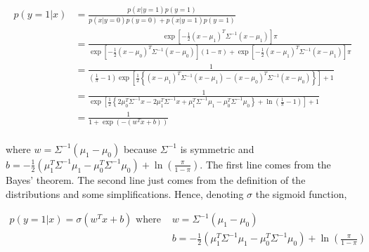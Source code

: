 \documentclass[a4paper, 11pt]{report}
\begin{document}
\begin{enumerate}[label=\alph*]
    \begin{equation*}
        \begin{aligned}
        p \left( y = 1 | x \right) &= \frac{p \left( x | y = 1 \right) p ( y = 1 )}{p(x | y = 0) p(y = 0) + p(x | y = 1) p(y = 1)} \\
        &= \frac{\exp \left[ - \frac{1}{2} \left( x - \mu_{1} \right)^{T} \Sigma^{-1} \left( x - \mu_{1} \right) \right] \pi}{\exp \left[ - \frac{1}{2} \left( x - \mu_{0} \right)^{T} \Sigma^{-1} \left( x - \mu_{0} \right) \right] \left( 1 - \pi \right) + \exp \left[ - \frac{1}{2} \left( x - \mu_{1} \right)^{T} \Sigma^{-1} \left( x - \mu_{1} \right) \right] \pi} \\
        &= \frac{1}{\left( \frac{1}{\pi} - 1 \right) \exp \left[ \frac{1}{2} \left\{ \left( x - \mu_{1} \right)^{T} \Sigma^{-1} \left( x - \mu_{1} \right) - \left( x - \mu_{0} \right)^{T} \Sigma^{-1} \left( x - \mu_{0} \right) \right\} \right] + 1} \\
        &= \frac{1}{\exp \left[ \frac{1}{2} \left\{ 2 \mu_{0}^{T} \Sigma^{-1} x - 2 \mu_{1}^{T} \Sigma^{-1} x + \mu_{1}^{T} \Sigma^{-1} \mu_{1} - \mu_{0}^{T} \Sigma^{-1} \mu_{0} \right\} + \ln \left( \frac{1}{\pi} - 1 \right) \right] + 1} \\
        &= \frac{1}{1 + \exp \left( -(w^{T}x + b) \right)} \\
        \end{aligned}
    \end{equation*}
    
    where $w = \Sigma^{-1} \left( \mu_{1} - \mu_{0} \right)$ because $\Sigma^{-1}$ is symmetric and $b = -\frac{1}{2} \left( \mu_{1}^{T} \Sigma^{-1} \mu_{1} - \mu_{0}^{T} \Sigma^{-1} \mu_{0} \right) + \ln \left(\frac{\pi}{1-\pi}\right)$. The first line comes from the Bayes' theorem. The second line just comes from the definition of the distributions and some simplifications. Hence, denoting $\sigma$ the sigmoid function,
    
    \begin{equation*}
        \boxed{\begin{aligned}
        p \left( y = 1 | x \right) = \sigma \left(w^{T}x + b \right) \text{ where } & w = \Sigma^{-1} \left( \mu_{1} - \mu_{0} \right) \\
        & b = -\frac{1}{2} \left( \mu_{1}^{T} \Sigma^{-1} \mu_{1} - \mu_{0}^{T} \Sigma^{-1} \mu_{0} \right) + \ln \left( \frac{\pi}{1-\pi} \right)
        \end{aligned}}
    \end{equation*}
    

\end{enumerate}
\end{document}
